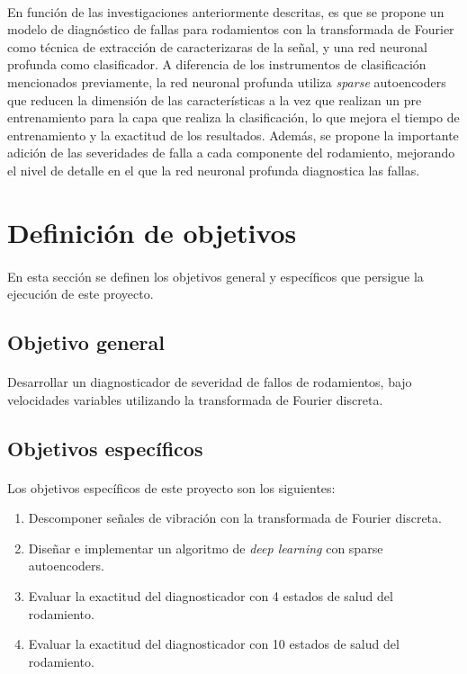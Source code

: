 \documentclass[12pt]{article}%
\begin{document}
\paragraph{}
En función de las investigaciones anteriormente descritas, es que se propone un modelo de diagnóstico de fallas para rodamientos con la transformada de Fourier como técnica de extracción de caracterizaras de la señal, y una red neuronal profunda como clasificador. A diferencia de los instrumentos de clasificación mencionados previamente, la red neuronal profunda utiliza \textit{sparse} autoencoders que reducen la dimensión de las características a la vez que realizan un pre entrenamiento para la capa que realiza la clasificación, lo que mejora el tiempo de entrenamiento y la exactitud de los resultados. Además, se propone la importante adición de las severidades de falla a cada componente del rodamiento, mejorando el nivel de detalle en el que la red neuronal profunda diagnostica las fallas.

\newpage
\section{Definición de objetivos}
\paragraph{}
En esta sección se definen los objetivos general y específicos que persigue la ejecución de este proyecto.
\subsection{Objetivo general}
\paragraph{}
Desarrollar un diagnosticador de severidad de fallos de rodamientos, bajo velocidades variables utilizando la transformada de Fourier discreta.

\subsection{Objetivos específicos}
\paragraph{}
Los objetivos específicos de este proyecto son los siguientes:
\begin{enumerate}
\item{Descomponer señales de vibración con la transformada de Fourier discreta.}
\item{Diseñar e implementar un algoritmo de \textit{deep learning} con sparse autoencoders.}
\item{Evaluar la exactitud del diagnosticador con 4 estados de salud del rodamiento.}
\item{Evaluar la exactitud del diagnosticador con 10 estados de salud del rodamiento.}
\end{enumerate}
\end{document}
